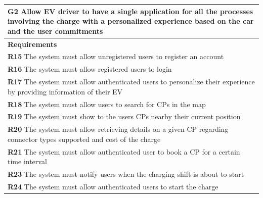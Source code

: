 \begin{table}[H]
    \begin{tabularx}{\textwidth}{X}
        \toprule
        \textbf{G2} Allow EV driver to have a single application for all the processes involving the charge with a personalized experience based on the car and the user commitments \\ \midrule
        \textbf{Requirements}                                                                                                                                                        \\ \midrule
        \textbf{R15} The system must allow unregistered users to register an account                                                                                                 \\
        \textbf{R16} The system must allow registered users to login                                                                                                                 \\
        \textbf{R17} The system must allow authenticated users to personalize their experience by providing information of their EV                                                  \\
        \textbf{R18} The system must allow users to search for CPs in the map                                                                                                        \\
        \textbf{R19} The system must show to the users CPs nearby their current position                                                                                             \\
        \textbf{R20} The system must allow retrieving details on a given CP regarding connector types supported and cost of the charge                                               \\
        \textbf{R21} The system must allow authenticated user to book a CP for a certain time interval                                                                               \\
        \textbf{R23} The system must notify users when the charging shift is about to start                                                                                          \\
        \textbf{R24} The system must allow authenticated users to start the charge                                                                                                   \\

\end{tabularx}
\end{table}
